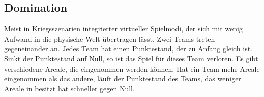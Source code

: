\subsection*{Domination}
Meist in Kriegsszenarien integrierter virtueller Spielmodi, der sich mit wenig Aufwand in die
physische Welt übertragen lässt.
Zwei Teams treten gegeneinander an. Jedes Team hat einen Punktestand, der zu Anfang
gleich ist. Sinkt der Punktestand auf Null, so ist das Spiel für dieses Team verloren. Es gibt
verschiedene Areale, die eingenommen werden können. Hat ein Team mehr Areale
eingenommen als das andere, läuft der Punktestand des Teams, das weniger Areale in
besitzt hat schneller gegen Null.
